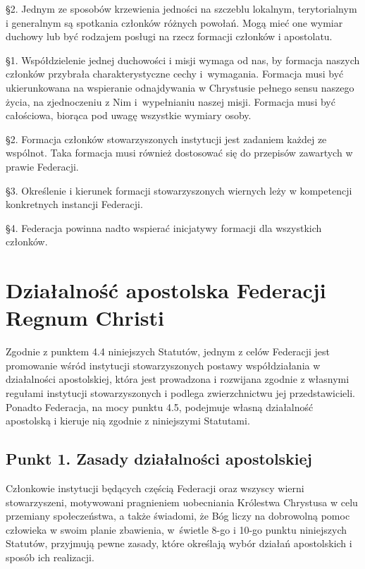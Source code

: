 \S{}2. Jednym ze sposobów krzewienia jedności na szczeblu lokalnym, terytorialnym i generalnym są spotkania członków różnych powołań. Mogą mieć one wymiar duchowy lub być rodzajem posługi na rzecz formacji członków i apostolatu.
 
 
 \S{}1. Współdzielenie jednej duchowości i misji wymaga od nas, by formacja naszych członków przybrała charakterystyczne cechy \mbox{i wymagania}. Formacja musi być ukierunkowana na wspieranie odnajdywania w Chrystusie pełnego sensu naszego życia, na zjednoczeniu z Nim \mbox{i wypełnianiu} naszej misji. Formacja musi być całościowa,  biorąca pod uwagę wszystkie wymiary osoby.


\S{}2. Formacja członków stowarzyszonych instytucji jest zadaniem każdej ze wspólnot. Taka formacja musi również dostosować się do przepisów zawartych w prawie Federacji.


\S{}3. Określenie i kierunek formacji stowarzyszonych wiernych leży w kompetencji konkretnych instancji Federacji.


\S{}4. Federacja powinna nadto wspierać inicjatywy formacji dla wszystkich członków.


\chapter{Działalność apostolska Federacji Regnum Christi}


 Zgodnie z punktem 4.4 niniejszych Statutów, jednym z celów Federacji jest promowanie wśród instytucji stowarzyszonych postawy współdziałania w działalności apostolskiej, która jest prowadzona i rozwijana zgodnie z własnymi regułami instytucji stowarzyszonych i podlega zwierzchnictwu jej przedstawicieli. Ponadto Federacja, na mocy punktu 4.5, podejmuje własną działalność apostolską i kieruje nią zgodnie z niniejszymi Statutami.


\section{Punkt 1. Zasady działalności apostolskiej}


                        
 Członkowie instytucji będących częścią Federacji oraz wszyscy wierni stowarzyszeni, motywowani pragnieniem uobecniania Królestwa Chrystusa w celu przemiany społeczeństwa, a także świadomi, że Bóg liczy na dobrowolną pomoc człowieka w swoim planie zbawienia, \mbox{w świetle} 8-go i 10-go punktu niniejszych Statutów, przyjmują pewne zasady, które określają wybór działań apostolskich i sposób ich realizacji.


